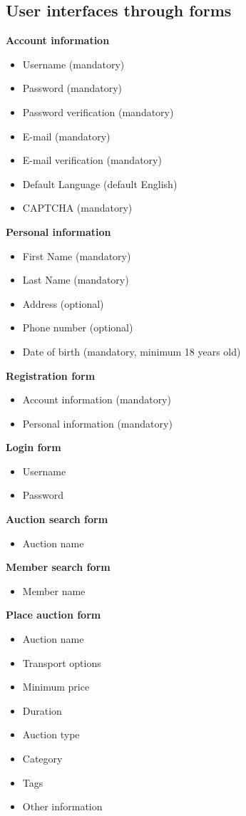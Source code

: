 	\subsection{User interfaces through forms}
	\textbf{Account information}
		\begin{itemize}
			\item Username (mandatory)
			\item Password (mandatory)
			\item Password verification (mandatory)
			\item E-mail (mandatory)
			\item E-mail verification (mandatory)
			\item Default Language (default English)
			\item CAPTCHA (mandatory)
		\end{itemize}
	\textbf{Personal information}
		\begin{itemize}
			\item First Name (mandatory)
			\item Last Name (mandatory)
			\item Address (optional)
			\item Phone number (optional)
			\item Date of birth (mandatory, minimum 18 years old)
		\end{itemize}
	\textbf{Registration form}
		\begin{itemize}
			\item Account information (mandatory)
			\item Personal information (mandatory)
		\end{itemize}
	\textbf{Login form}
		\begin{itemize}
			\item Username
			\item Password
		\end{itemize}
	\textbf{Auction search form}
		\begin{itemize}
			\item Auction name
		\end{itemize}
	\textbf{Member search form}
		\begin{itemize}
			\item Member name
		\end{itemize}
	\textbf{Place auction form}
		\begin{itemize}
			\item Auction name
			\item Transport options
			\item Minimum price
			\item Duration
			\item Auction type
			\item Category
			\item Tags
			\item Other information
		\end{itemize}
